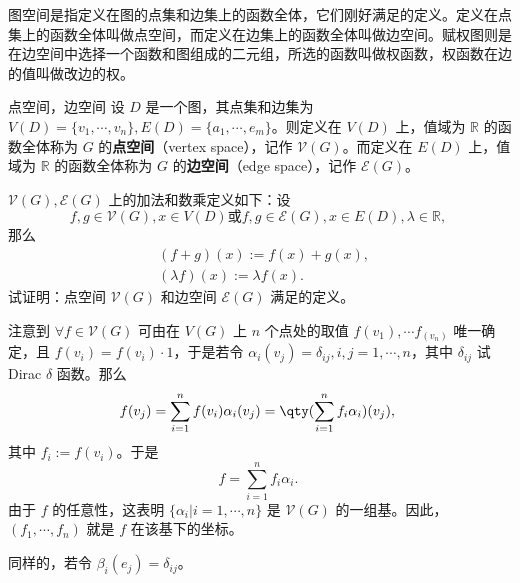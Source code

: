 
图空间是指定义在图的点集和边集上的函数全体，它们刚好满足的定义。定义在点集上的函数全体叫做点空间，而定义在边集上的函数全体叫做边空间。赋权图则是在边空间中选择一个函数和图组成的二元组，所选的函数叫做权函数，权函数在边的值叫做改边的权。

\begin{definition}{点空间，边空间}
设 $D$ 是一个图，其点集和边集为 $V(D)=\{v_1,\cdots,v_n\},E(D)=\{a_1,\cdots,e_m\}$。则定义在 $V(D)$ 上，值域为 $\mathbb R$ 的函数全体称为 $G$ 的\textbf{点空间}（vertex space），记作 $\mathcal V(G)$。而定义在 $E(D)$ 上，值域为 $\mathbb R$ 的函数全体称为 $G$ 的\textbf{边空间}（edge space），记作 $\mathcal E(G)$。
\end{definition}


\begin{exercise}{}
 $\mathcal V(G),\mathcal E(G)$ 上的加法和数乘定义如下：设
\begin{equation}
f,g\in\mathcal V(G),x\in V(D)\text{或} f,g\in\mathcal E(G),x\in E(D),\lambda\in \mathbb R,~
\end{equation}
那么
\begin{equation}
\begin{aligned}
&(f+g)(x):=f(x)+g(x),\\
&(\lambda f)(x):=\lambda f(x).
\end{aligned}~
\end{equation}
试证明：点空间 $\mathcal V(G)$ 和边空间 $\mathcal E(G)$ 满足的定义。
\end{exercise}

注意到 $\forall f\in\mathcal V(G)$ 可由在 $V(G)$ 上 $n$ 个点处的取值 $f(v_1),\cdots f_(v_n)$ 唯一确定，且 $f(v_i)=f(v_i)\cdot 1$，于是若令 $\alpha_i(v_j)=\delta_{ij},i,j=1,\cdots,n$，其中 $\delta_{ij}$ 试Dirac $\delta$ 函数。那么
\begin{equation}
f(v_j)=\sum_{i=1}^n f(v_i)\alpha_i(v_j)=\qty(\sum_{i=1}^n f_i\alpha_i)(v_j),~
\end{equation}
其中 $f_i:=f(v_i)$。于是
\begin{equation}
f=\sum_{i=1}^n f_i\alpha_i.~
\end{equation}
由于 $f$ 的任意性，这表明 $\{\alpha_i|i=1,\cdots,n\}$ 是 $\mathcal V(G)$ 的一组基。因此，$(f_1,\cdots,f_n)$ 就是 $f$ 在该基下的坐标。

同样的，若令 $\beta_i(e_j)=\delta_{ij}$。












